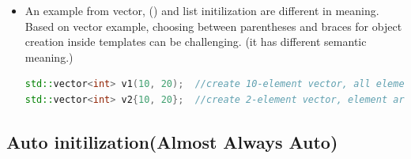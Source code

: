 \documentclass[a4paper,11pt,twoside]{book}
\begin{document}
\begin{itemize}
	\item An example from vector, () and list initilization are different in meaning. Based on vector example, choosing between parentheses and braces for object creation inside templates can be challenging. (it has different semantic meaning.)
	
\begin{lstlisting}[frame=single, language=c++,mathescape=true]
std::vector<int> v1(10, 20);  //create 10-element vector, all elements 20.
std::vector<int> v2{10, 20};  //create 2-element vector, element are 10 and 20
\end{lstlisting}
		
	
\end{itemize}

\subsection{Auto initilization(Almost Always Auto)}
\end{document}
